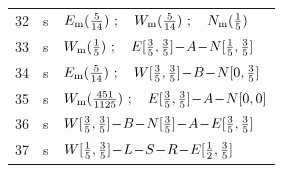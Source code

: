 \begin{longtable}{@{}rcp{}@{}}
32 & s & \(E_{\rm m}(\frac{5}{14})\ ;\quad W_{\rm m}(\frac{5}{14})\ ;\quad N_{\rm m}(\frac{1}{5})\)\\[2pt]
33 & s & \(W_{\rm m}(\frac{1}{5})\ ;\quad E[\frac{3}{5},\frac{3}{5}]\! -\! A\! -\! N[\frac{1}{5},\frac{3}{5}]\)\\[2pt]
34 & s & \(E_{\rm m}(\frac{5}{14})\ ;\quad W[\frac{3}{5},\frac{3}{5}]\! -\! B\! -\! N[0,\frac{3}{5}]\)\\[2pt]
35 & s & \(W_{\rm m}(\frac{451}{1125})\ ;\quad E[\frac{3}{5},\frac{3}{5}]\! -\! A\! -\! N[0,0]\)\\[2pt]
36 & s & \(\htV{W}{\frac{3}{5},\frac{3}{5}}\! -\! B\! -\! \htV{N}{\frac{3}{5}}\! -\! A\! -\! \htV{E}{\frac{3}{5},\frac{3}{5}}\)\\[2pt]
37 & s & \(\htV{W}{\frac{1}{5},\frac{3}{5}}\! -\! L\! -\! S\! -\! R\! -\! \htV{E}{\frac{1}{2},\frac{3}{5}}\)\\[2pt]
\end{longtable}
\endgroup

